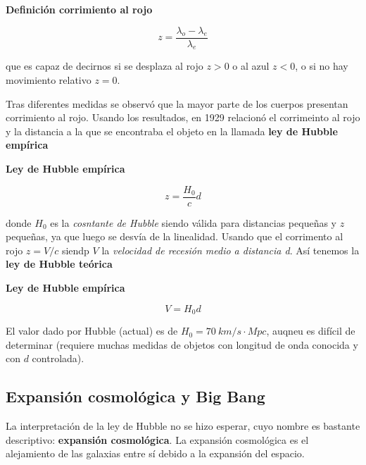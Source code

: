 \begin{Resaltar}
	\begin{center}
		\textbf{Definición corrimiento al rojo}
	\end{center}
	\begin{equation}
		z = \frac{\lambda_o - \lambda_e}{\lambda_e}
	\end{equation}
\end{Resaltar}
que es capaz de decirnos si se desplaza al rojo $z>0$ o al azul $z<0$, o si no hay movimiento relativo $z=0$.

Tras diferentes medidas se observó que la mayor parte de los cuerpos presentan corrimiento al rojo. Usando los resultados, en 1929 relacionó el corrimeinto al rojo y la distancia a la que se encontraba el objeto en la llamada \textbf{ley de Hubble empírica}

\begin{Resaltar}
	\begin{center}
		\textbf{Ley de Hubble empírica}
	\end{center}
	\begin{equation}
		z = \frac{H_0}{c}d
	\end{equation}
\end{Resaltar}
donde $H_0$ es la \textit{cosntante de Hubble} siendo válida para distancias pequeñas y $z$ pequeñas, ya que luego se desvía de la linealidad. Usando que el corrimento al rojo $z=V/c$ siendp $V$ la \textit{velocidad de recesión medio a distancia d}. Así tenemos la \textbf{ley de Hubble teórica}

\begin{Resaltar}
	\begin{center}
		\textbf{Ley de Hubble empírica}
	\end{center}
	\begin{equation}
		V= H_0 d
	\end{equation}

\end{Resaltar}
El valor dado por Hubble (actual) es de $H_0=\SI{70}{km/s\cdot Mpc}$, auqneu es difícil de determinar (requiere muchas medidas de objetos con longitud de onda conocida y con $d$ controlada).

\subsection{Expansión cosmológica y Big Bang}

La interpretación de la ley de Hubble no se hizo esperar, cuyo nombre es bastante descriptivo: \textbf{expansión cosmológica}. La expansión cosmológica es el alejamiento de las galaxias entre sí debido a la expansión del espacio.


